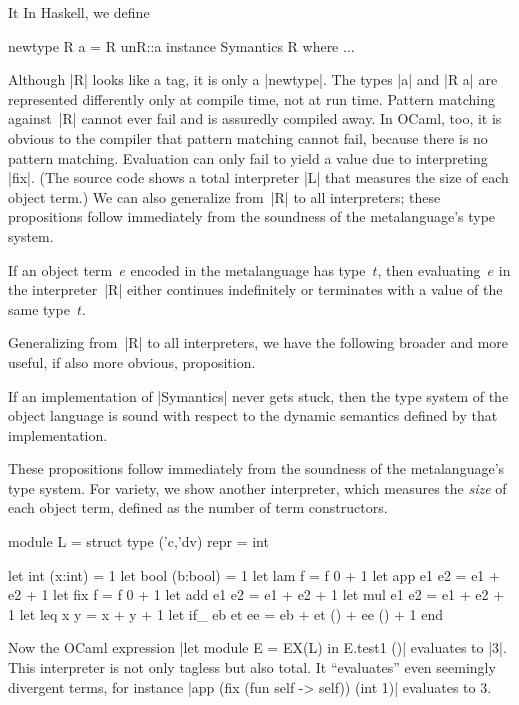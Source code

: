 \ifshort It \else
In Haskell, we define
\begin{code}
newtype R a = R {unR::a}
instance Symantics R where ...
\end{code}
Although |R| looks like a tag, it is only
a |newtype|.  The types |a| and |R a| are represented differently
only at compile time, not at run time.  Pattern matching against~|R|
cannot ever fail and is assuredly compiled away.
In OCaml, too, it
\fi is obvious to the compiler that
pattern matching cannot fail, because there is no
pattern matching. Evaluation can only fail to yield a value
due to interpreting |fix|.
\ifshort
(The source code shows a total interpreter |L| that measures
the size of each object term.)
\fi
\ifshort
We can also generalize from~|R| to all interpreters;
these propositions follow immediately from the soundness of the
metalanguage's type system.
\fi
\begin{proposition}
If an object term~$e$ encoded in the metalanguage has type~$t$,
then evaluating~$e$ in the interpreter~|R| either continues
indefinitely or terminates with a value of the same type~$t$.
\end{proposition}
\ifshort\else
Generalizing from~|R| to all interpreters, we have the following
broader and more useful, if also more obvious, proposition.
\fi
\begin{proposition}
  If an implementation of |Symantics| never gets stuck, then
  the type system of the object
  language is sound with respect to the dynamic semantics defined by
  that implementation.
\end{proposition}
\ifshort\else
These propositions follow immediately from the soundness of the
metalanguage's type system.
\fi
\ifshort\else
For variety, we show another interpreter, which measures the \emph{size}
of each object term, defined as the number of term
constructors.
\begin{code}
module L = struct
  type ('c,'dv) repr = int

  let int  (x:int)  = 1
  let bool (b:bool) = 1
  let lam  f        = f 0 + 1
  let app  e1 e2    = e1 + e2 + 1
  let fix  f        = f 0 + 1
  let add  e1 e2    = e1 + e2 + 1
  let mul  e1 e2    = e1 + e2 + 1
  let leq  x y      = x + y + 1
  let if_  eb et ee = eb + et () + ee () + 1
end
\end{code}
Now the OCaml expression
|let module E = EX(L) in E.test1 ()|
evaluates to |3|. This interpreter is not only tagless but also
total. It ``evaluates'' even seemingly divergent terms, for instance
|app (fix (fun self -> self)) (int 1)| evaluates to $3$.
\fi

